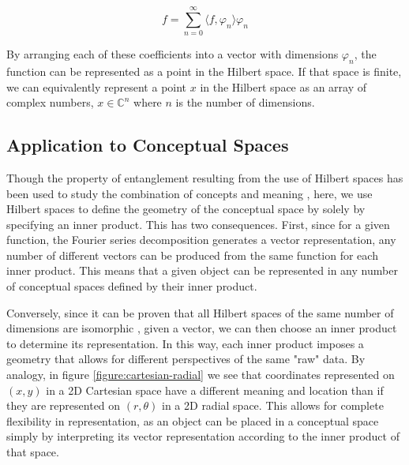 \begin{equation} 
  \label{equation:fourier-series}
  f = \sum_{n=0}^\infty \langle f, \varphi_n \rangle \varphi_n
\end{equation}

By arranging each of these coefficients into a vector with dimensions $\varphi_n$, the function can be represented as a point in the Hilbert space. If that space is finite, we can equivalently represent a point $x$ in the Hilbert space as an array of complex numbers, $x \in \mathbb{C}^n$ where $n$ is the number of dimensions.

\subsection{Application to Conceptual Spaces}
\label{subsection:application-conceptual-spaces}

Though the property of entanglement resulting from the use of Hilbert spaces has been used to study the combination of concepts \citep{aerts2005theory} and meaning \citep{coecke2010mathematical}, here, we use Hilbert spaces to define the geometry of the conceptual space by solely by specifying an inner product.  This has two consequences.  First, since for a given function, the Fourier series decomposition generates a vector representation, any number of different vectors can be produced from the same function for each inner product.  This means that a given object can be represented in any number of conceptual spaces defined by their inner product.

Conversely, since it can be proven that all Hilbert spaces of the same number of dimensions are isomorphic \citep{kennedy2013hilbert}, given a vector, we can then choose an inner product to determine its representation.  In this way, each inner product imposes a geometry that allows for different perspectives of the same "raw" data.  By analogy, in figure \ref{figure:cartesian-radial} we see that coordinates represented on $(x, y)$ in a 2D Cartesian space have a different meaning and location than if they are represented on $(r, \theta)$ in a 2D radial space.  This allows for complete flexibility in representation, as an object can be placed in a conceptual space simply by interpreting its vector representation according to the inner product of that space. \citep{wiggins2018creativity}

